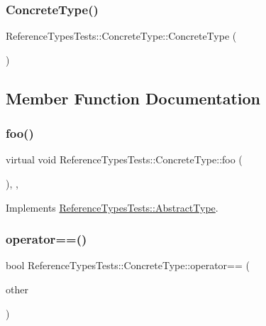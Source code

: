 \subsubsection{\texorpdfstring{ConcreteType()}{ConcreteType()}}
{\footnotesize\ttfamily Reference\+Types\+Tests\+::\+Concrete\+Type\+::\+Concrete\+Type (\begin{DoxyParamCaption}{ }\end{DoxyParamCaption})\hspace{0.3cm}{\ttfamily [inline]}}



\subsection{Member Function Documentation}
\mbox{\label{classReferenceTypesTests_1_1ConcreteType_aca90c05903e4ab0c480ae84c1ca75c2e}} 
\subsubsection{\texorpdfstring{foo()}{foo()}}
{\footnotesize\ttfamily virtual void Reference\+Types\+Tests\+::\+Concrete\+Type\+::foo (\begin{DoxyParamCaption}{ }\end{DoxyParamCaption})\hspace{0.3cm}{\ttfamily [inline]}, {\ttfamily [override]}, {\ttfamily [virtual]}}



Implements \mbox{\hyperlink{classReferenceTypesTests_1_1AbstractType_a5688531c71ea9a2072d18413fb9ee356}{Reference\+Types\+Tests\+::\+Abstract\+Type}}.

\mbox{\label{classReferenceTypesTests_1_1ConcreteType_ae575c7e4ffbc844f36cfa475bf1c8f1e}} 
\subsubsection{\texorpdfstring{operator==()}{operator==()}}
{\footnotesize\ttfamily bool Reference\+Types\+Tests\+::\+Concrete\+Type\+::operator== (\begin{DoxyParamCaption}\item[{const \mbox{\hyperlink{classReferenceTypesTests_1_1ConcreteType}{Concrete\+Type}} \&}]{other }\end{DoxyParamCaption})\hspace{0.3cm}{\ttfamily [inline]}}



